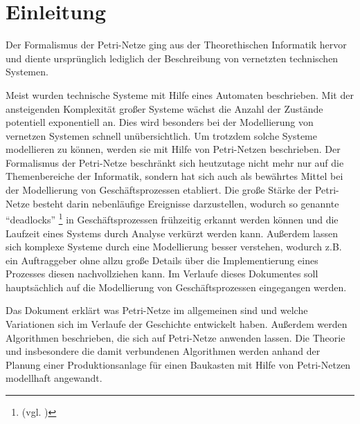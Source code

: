 
\chapter{Einleitung}
Der Formalismus der Petri-Netze ging aus der Theorethischen Informatik hervor
und diente ursprünglich lediglich der Beschreibung von vernetzten technischen Systemen.

Meist wurden technische Systeme mit Hilfe eines Automaten beschrieben.
Mit der ansteigenden Komplexität großer Systeme wächst die Anzahl der Zustände potentiell exponentiell an.
Dies wird besonders bei der Modellierung von vernetzen Systemen schnell unübersichtlich.
Um trotzdem solche Systeme modellieren zu können, werden sie mit Hilfe von Petri-Netzen beschrieben.
Der Formalismus der Petri-Netze beschränkt sich heutzutage nicht mehr nur auf die Themenbereiche der Informatik,
sondern hat sich auch als bewährtes Mittel bei der Modellierung von Geschäftsprozessen etabliert.
Die große Stärke der Petri-Netze besteht darin nebenläufige Ereignisse darzustellen,
wodurch so genannte \enquote{deadlocks} \footnote{(vgl. \cite{microsoft:deadlocks})}
in Geschäftsprozessen frühzeitig erkannt werden können und
die Laufzeit eines Systems durch Analyse verkürzt werden kann.
Außerdem lassen sich komplexe Systeme durch eine Modellierung besser verstehen,
wodurch z.B. ein Auftraggeber ohne allzu große Details über die Implementierung eines Prozesses
diesen nachvollziehen kann.
Im Verlaufe dieses Dokumentes soll hauptsächlich auf die Modellierung von Geschäftsprozessen eingegangen werden.

Das Dokument erklärt was Petri-Netze im allgemeinen sind und
welche Variationen sich im Verlaufe der Geschichte entwickelt haben.
Außerdem werden Algorithmen beschrieben, die sich auf Petri-Netze anwenden lassen.
Die Theorie und insbesondere die damit verbundenen Algorithmen
werden anhand der Planung einer Produktionsanlage für einen Baukasten
mit Hilfe von Petri-Netzen modellhaft angewandt.
\newpage

